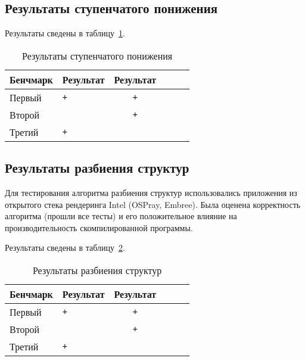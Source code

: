 \subsection{Результаты ступенчатого понижения}\label{subsec:results/results/lowering}

Результаты сведены в таблицу~\cref{tab:results/lowering}.

\begin{table}
    \centering
    \captionsetup{justification=centering}
    \caption{Результаты ступенчатого понижения}\label{tab:results/lowering}
    \begin{tabular}{llc|llc}
        \toprule
        Бенчмарк & Результат & Результат \\
        \midrule
        Первый   & \verb|+|  & \verb|+|  \\
        Второй   & \verb| |  & \verb|+|  \\
        Третий   & \verb|+|  & \verb| |  \\
        \bottomrule
    \end{tabular}
\end{table}

\subsection{Результаты разбиения структур}\label{subsec:results/results/splitter}

Для тестирования алгоритма разбиения структур использовались приложения из открытого стека рендеринга Intel (OSPray, Embree). Была оценена корректность алгоритма (прошли все тесты) и его положительное влияние на производительность скомпилированной программы.

Результаты сведены в таблицу~\cref{tab:results/splitter}.

\begin{table}
    \centering
    \captionsetup{justification=centering}
    \caption{Результаты разбиения структур}\label{tab:results/splitter}
    \begin{tabular}{llc|llc}
        \toprule
        Бенчмарк & Результат & Результат \\
        \midrule
        Первый   & \verb|+|  & \verb|+|  \\
        Второй   & \verb| |  & \verb|+|  \\
        Третий   & \verb|+|  & \verb| |  \\
        \bottomrule
    \end{tabular}
\end{table}

